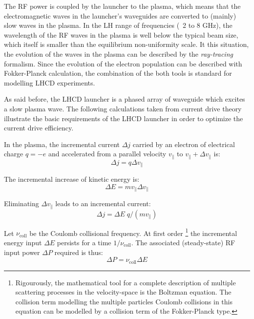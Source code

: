 


The RF power is coupled by the launcher to the plasma, which means that the electromagnetic waves in the launcher’s waveguides are converted to (mainly) slow waves in the plasma. In the LH range of frequencies (~2 to 8 GHz), the wavelength of the RF waves in the plasma is well below the typical beam size, which itself is smaller than the equilibrium non-uniformity scale. It this situation, the evolution of the waves in the plasma can be described by the \emph{ray-tracing} formalism. Since the evolution of the electron population can be described with Fokker-Planck calculation, the combination of the both tools is standard for modelling LHCD experiments.

As said before, the LHCD launcher is a phased array of waveguide which excites a slow plasma wave. The following calculations taken from current drive theory illustrate the basic requirements of the LHCD launcher in order to optimize the current drive efficiency. 

In the plasma, the incremental current $\Delta j$ carried by an electron of electrical charge $q=-e$ and accelerated from a parallel velocity $v_\parallel$ to $v_\parallel + \Delta v_\parallel$ is:
$$\Delta j = q \Delta v_{\parallel}$$

The incremental increase of kinetic energy is:
$$\Delta E = m v_{\parallel} \Delta v_{\parallel}$$

Eliminating $\Delta v_{\parallel}$ leads to an incremental current: 
$$\Delta j = \Delta E \; q/(m v_{\parallel})$$ 

Let $\nu_\mathrm{coll}$ be the Coulomb collisional frequency. At first order \footnote{Rigourously, the mathematical tool for a complete description of multiple scattering processes in the velocity-space is the Boltzman equation. The collision term modelling the multiple particles Coulomb collisions in this equation can be modelled by a collision term of the Fokker-Planck type.} the incremental energy input $\Delta E$ persists for a time $1/\nu_\mathrm{coll}$. The associated (steady-state) RF input power $\Delta P$ required is thus: 
$$\Delta P = \nu_\mathrm{coll} \Delta E$$ 

